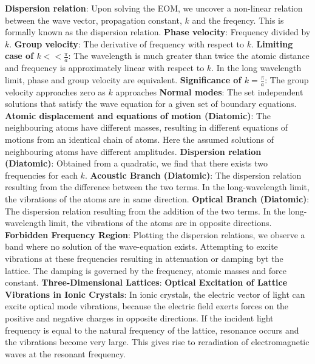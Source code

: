 \documentclass{article}
\numberwithin{equation}{section}
\begin{document}
\newline
\textbf{Dispersion relation}: Upon solving the EOM, we uncover a non-linear relation between the wave vector, propagation constant, $k$ and the freqency. This is formally known as the dispersion relation.
\newline
\textbf{Phase velocity}: Frequency divided by $k$.
\newline
\textbf{Group velocity}: The derivative of frequency with respect to $k$.
\newline
\textbf{Limiting case of $k<<\frac{\pi}{a}$}: The wavelength is much greater than twice the atomic distance and frequency is approximately linear with respect to $k$. In the long wavelength limit, phase and group velocity are equivalent.
\newline
\textbf{Significance of $k=\frac{\pi}{a}$}: The group velocity approaches zero as $k$ approaches 
\newline
\textbf{Normal modes}: The set independent solutions that satisfy the wave equation for a given set of boundary equations.
\newline
\textbf{Atomic displacement and equations of motion (Diatomic)}: The neighbouring atoms have different masses, resulting in different equations of motions from an identical chain of atoms. Here the assumed solutions of neighbouring atoms have different amplitudes.
\newline
\textbf{Dispersion relation (Diatomic)}: Obtained from a quadratic, we find that there exists two frequencies for each $k$.
\newline
\textbf{Acoustic Branch (Diatomic)}: The dispersion relation resulting from the difference between the two terms. In the long-wavelength limit, the vibrations of the atoms are in same direction.
\newline
\textbf{Optical Branch (Diatomic)}: The dispersion relation resulting from the addition of the two terms. In the long-wavelength limit, the vibrations of the atoms are in opposite directions.
\newline
\textbf{Forbidden Frequency Region}: Plotting the dispersion relations, we observe a band where no solution of the wave-equation exists. Attempting to excite vibrations at these frequencies resulting in attenuation or damping byt the lattice. The damping is governed by the frequency, atomic masses and force constant.  
\newline
\textbf{Three-Dimensional Lattices}:
\newline
\textbf{Optical Excitation of Lattice Vibrations in Ionic Crystals}: In ionic crystals, the electric vector of light can excite optical mode vibrations, because the electric field exerts forces on the positive and negative charges in opposite directions. If the incident light frequency is equal to the natural frequency of the lattice, resonance occurs and the vibrations become very large. This gives rise to reradiation of electromagnetic waves at the resonant frequency.
\newline
\end{document}
